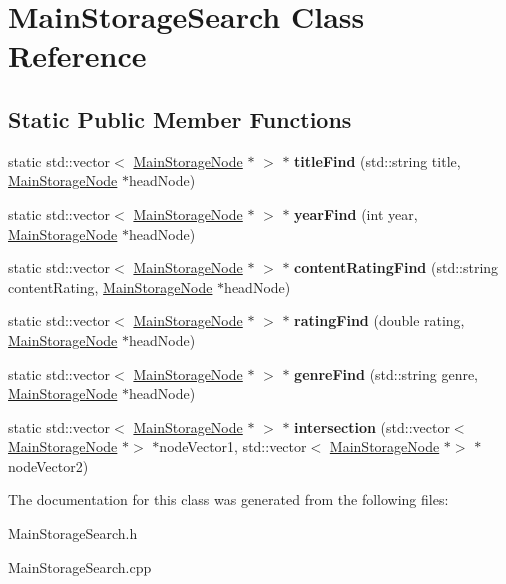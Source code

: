 \hypertarget{class_main_storage_search}{}\section{Main\+Storage\+Search Class Reference}
\label{class_main_storage_search}
\subsection*{Static Public Member Functions}
\begin{DoxyCompactItemize}
\item 
\mbox{\label{class_main_storage_search_a9f202b155bca5101b44ae38c87e2b5ac}} 
static std\+::vector$<$ \hyperlink{class_main_storage_node}{Main\+Storage\+Node} $\ast$ $>$ $\ast$ {\bfseries title\+Find} (std\+::string title, \hyperlink{class_main_storage_node}{Main\+Storage\+Node} $\ast$head\+Node)
\item 
\mbox{\label{class_main_storage_search_ad84c04687912578e239bff77b171b2a1}} 
static std\+::vector$<$ \hyperlink{class_main_storage_node}{Main\+Storage\+Node} $\ast$ $>$ $\ast$ {\bfseries year\+Find} (int year, \hyperlink{class_main_storage_node}{Main\+Storage\+Node} $\ast$head\+Node)
\item 
\mbox{\label{class_main_storage_search_a4d1231017d526daa892a1d753e436102}} 
static std\+::vector$<$ \hyperlink{class_main_storage_node}{Main\+Storage\+Node} $\ast$ $>$ $\ast$ {\bfseries content\+Rating\+Find} (std\+::string content\+Rating, \hyperlink{class_main_storage_node}{Main\+Storage\+Node} $\ast$head\+Node)
\item 
\mbox{\label{class_main_storage_search_a9a19d7e464338974946dbe03e360d9e0}} 
static std\+::vector$<$ \hyperlink{class_main_storage_node}{Main\+Storage\+Node} $\ast$ $>$ $\ast$ {\bfseries rating\+Find} (double rating, \hyperlink{class_main_storage_node}{Main\+Storage\+Node} $\ast$head\+Node)
\item 
\mbox{\label{class_main_storage_search_a446012e6fe3beac5c58ad5d2a9eb5d6c}} 
static std\+::vector$<$ \hyperlink{class_main_storage_node}{Main\+Storage\+Node} $\ast$ $>$ $\ast$ {\bfseries genre\+Find} (std\+::string genre, \hyperlink{class_main_storage_node}{Main\+Storage\+Node} $\ast$head\+Node)
\item 
\mbox{\label{class_main_storage_search_a7352485e1c4f3b99de09bb39beeda804}} 
static std\+::vector$<$ \hyperlink{class_main_storage_node}{Main\+Storage\+Node} $\ast$ $>$ $\ast$ {\bfseries intersection} (std\+::vector$<$ \hyperlink{class_main_storage_node}{Main\+Storage\+Node} $\ast$$>$ $\ast$node\+Vector1, std\+::vector$<$ \hyperlink{class_main_storage_node}{Main\+Storage\+Node} $\ast$$>$ $\ast$node\+Vector2)
\end{DoxyCompactItemize}


The documentation for this class was generated from the following files\+:\begin{DoxyCompactItemize}
\item 
Main\+Storage\+Search.\+h\item 
Main\+Storage\+Search.\+cpp\end{DoxyCompactItemize}
